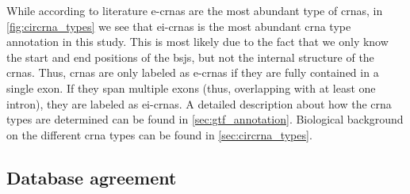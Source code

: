 While according to literature \glspl{e-crna} are the most abundant type of
\glspl{crna}, in \cref{fig:circrna_types} we see that \glspl{ei-crna} is the
most abundant \gls{crna} type annotation in this study.
This is most likely due to the fact that we only know the start and end
positions of the \glspl{bsj}, but not the internal structure of the
\glspl{crna}.
Thus, \glspl{crna} are only labeled as \glspl{e-crna} if they are fully
contained in a single exon.
If they span multiple exons (thus, overlapping with at least one intron), they
are labeled as \glspl{ei-crna}.
A detailed description about how the \gls{crna} types are determined can be
found in \cref{sec:gtf_annotation}.
Biological background on the different \gls{crna} types can be found in
\cref{sec:circrna_types}.

\subsection{Database agreement}
